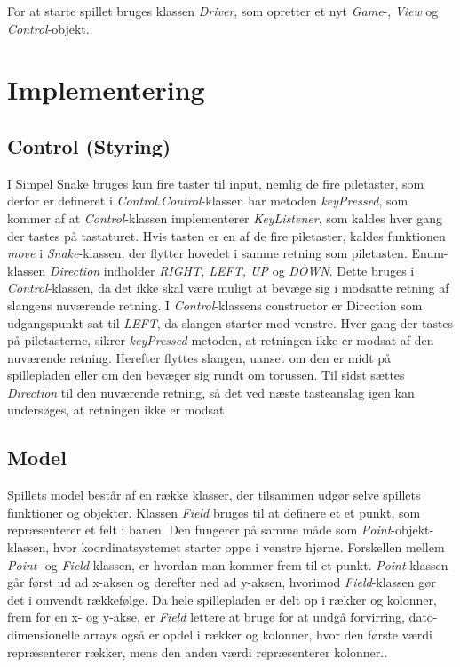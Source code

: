\documentclass{report}
\begin{document}
For at starte spillet bruges klassen \textit{Driver}, som opretter et nyt \textit{Game}-, \textit{View} og \textit{Control}-objekt.



\section{Implementering}
\subsection{Control (Styring)}
I Simpel Snake bruges kun fire taster til input, nemlig de fire piletaster, som derfor er defineret i \textit{Control}.\textit{Control}-klassen har metoden \textit{keyPressed}, som kommer af at \textit{Control}-klassen implementerer \textit{KeyListener}, som kaldes hver gang der tastes på tastaturet. Hvis tasten er en af de fire piletaster, kaldes funktionen \textit{move} i \textit{Snake}-klassen, der flytter hovedet i samme retning som piletasten.
Enum-klassen \textit{Direction} indholder \textit{RIGHT, LEFT, UP} og \textit{DOWN}. Dette bruges i \textit{Control}-klassen, da det ikke skal være muligt at bevæge sig i modsatte retning af slangens nuværende retning.
I \textit{Control}-klassens constructor er Direction som udgangspunkt sat til \textit{LEFT}, da slangen starter mod venstre. Hver gang der tastes på piletasterne, sikrer \textit{keyPressed}-metoden, at retningen ikke er modsat af den nuværende retning. Herefter flyttes slangen, uanset om den er midt på spillepladen eller om den bevæger sig rundt om torussen. Til sidst sættes \textit{Direction} til den nuværende retning, så det ved næste tasteanslag igen kan undersøges, at retningen ikke er modsat.

\subsection{Model}
Spillets model består af en række klasser, der tilsammen udgør selve spillets funktioner og objekter.
Klassen \textit{Field} bruges til at definere et et punkt, som repræsenterer et felt i banen. Den fungerer på samme måde som \textit{Point}-objekt-klassen, hvor koordinatsystemet starter oppe i venstre hjørne. Forskellen mellem \textit{Point}- og \textit{Field}-klassen, er hvordan man kommer frem til et punkt. \textit{Point}-klassen går først ud ad x-aksen og derefter ned ad y-aksen, hvorimod \textit{Field}-klassen gør det i omvendt rækkefølge. Da hele spillepladen er delt op i rækker og kolonner, frem for en x- og y-akse, er \textit{Field} lettere at bruge for at undgå forvirring, dato-dimensionelle arrays også er opdel i rækker og kolonner, hvor den første værdi repræsenterer rækker, mens den anden værdi repræsenterer kolonner..
\end{document}

